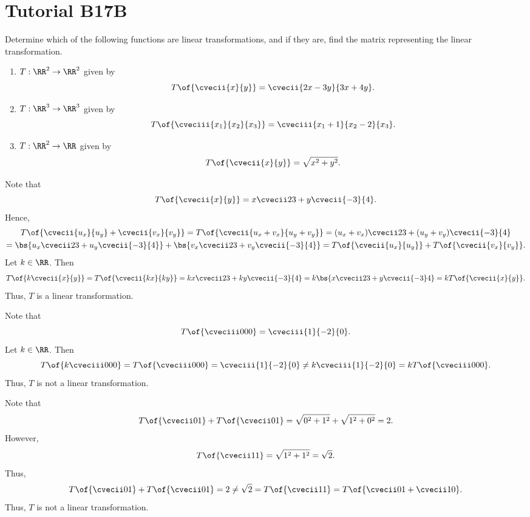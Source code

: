 \section{Tutorial B17B}

\begin{problem}
    Determine which of the following functions are linear transformations, and if they are, find the matrix representing the linear transformation.

    \begin{enumerate}
        \item $T : \RR^2 \to \RR^2$ given by \[T\of{\cvecii{x}{y}} = \cvecii{2x-3y}{3x+4y}.\]
        \item $T : \RR^3 \to \RR^3$ given by \[T\of{\cveciii{x_1}{x_2}{x_3}} = \cveciii{x_1+1}{x_2-2}{x_3}.\]
        \item $T : \RR^2 \to \RR$ given by \[T\of{\cvecii{x}{y}} = \sqrt{x^2 + y^2}.\]
    \end{enumerate}
\end{problem}
\begin{solution}
    \begin{ppart}
        Note that \[T\of{\cvecii{x}{y}} = x \cvecii23 + y \cvecii{-3}{4}.\] Hence,
        \begin{gather*}
            T\of{\cvecii{u_x}{u_y} + \cvecii{v_x}{v_y}} = T\of{\cvecii{u_x + v_x}{u_y + v_y}} = (u_x + v_x) \cvecii23 + (u_y + v_y) \cvecii{-3}{4}\\
            = \bs{u_x \cvecii23 + u_y \cvecii{-3}{4}} + \bs{v_x \cvecii23 + v_y \cvecii{-3}{4}} = T\of{\cvecii{u_x}{u_y}} + T\of{\cvecii{v_x}{v_y}}.
        \end{gather*} Let $k \in \RR$. Then \[T\of{k\cvecii{x}{y}} = T\of{\cvecii{kx}{ky}} = kx \cvecii23 + ky \cvecii{-3}{4} = k \bs{x \cvecii23 + y \cvecii{-3}4} = k T\of{\cvecii{x}{y}}.\] Thus, $T$ is a linear transformation.
    \end{ppart}
    \begin{ppart}
        Note that \[T\of{\cveciii000} = \cveciii{1}{-2}{0}.\] Let $k \in \RR$. Then \[T\of{k\cveciii000} = T\of{\cveciii000} = \cveciii{1}{-2}{0} \neq k \cveciii{1}{-2}{0} = kT\of{\cveciii000}.\] Thus, $T$ is not a linear transformation.
    \end{ppart}
    \begin{ppart}
        Note that \[T\of{\cvecii01} + T\of{\cvecii01} = \sqrt{0^2 + 1^2} + \sqrt{1^2 + 0^2} = 2.\] However, \[T\of{\cvecii11} = \sqrt{1^2 + 1^2} = \sqrt2.\] Thus, \[T\of{\cvecii01} + T\of{\cvecii01} = 2 \neq \sqrt2 = T\of{\cvecii11} = T\of{\cvecii01 + \cvecii10}.\] Thus, $T$ is not a linear transformation.
    \end{ppart}
\end{solution}

